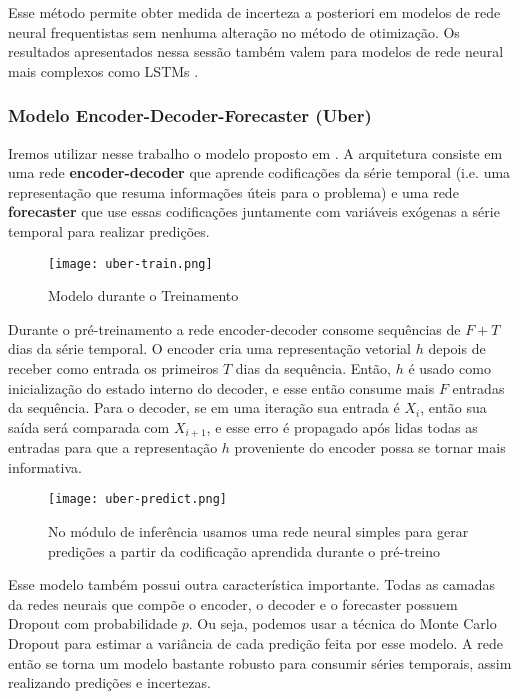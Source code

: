 Esse método permite obter medida de incerteza a posteriori em modelos de rede
neural frequentistas sem nenhuma alteração no método de otimização.
Os resultados apresentados nessa sessão também valem para modelos de rede neural
mais complexos como LSTMs \citep{dropbayes}.
 
\subsubsection{Modelo Encoder-Decoder-Forecaster (Uber)}

Iremos utilizar nesse trabalho o modelo proposto em \citep{ubertime}. A
arquitetura consiste em uma rede \textbf{encoder-decoder} que aprende codificações da
série temporal (i.e. uma representação que resuma informações úteis para o
problema) e uma rede \textbf{forecaster} que use essas codificações juntamente com
variáveis exógenas a série temporal para realizar predições.  \\ 



\begin{figure}[H]
\centering
\texttt{[image: uber-train.png]}
\caption{Modelo durante o Treinamento \citep{ubertime}}
\label{img:uber1}
\end{figure}


Durante o pré-treinamento a rede encoder-decoder consome sequências de $F + T$ dias
da série temporal. O encoder cria uma representação vetorial $h$ depois de
receber como entrada os primeiros $T$ dias da sequência. Então, $h$ é usado como
inicialização do estado interno do decoder, e esse então consume mais $F$
entradas da sequência. Para o decoder, se em uma iteração sua entrada é $X_i$,
então sua saída será comparada com $X_{i+1}$, e esse erro é propagado após lidas
todas as entradas para que a representação $h$ proveniente do encoder possa se
tornar mais informativa. \\


\begin{figure}[H]
  \centering
  \texttt{[image: uber-predict.png]}
  \caption{No módulo de inferência usamos uma rede neural simples para gerar
    predições a partir da codificação aprendida durante o pré-treino \citep{ubertime}}
  \label{img:uber2}
\end{figure}




Esse modelo também possui outra característica importante. Todas as camadas da
redes neurais que compõe o encoder, o decoder e o forecaster possuem
Dropout com probabilidade $p$. Ou seja, podemos usar a técnica do Monte
Carlo Dropout para estimar a variância de cada predição feita por esse modelo. A
rede então se torna um modelo bastante robusto para consumir séries temporais,
assim realizando predições e incertezas.\\


